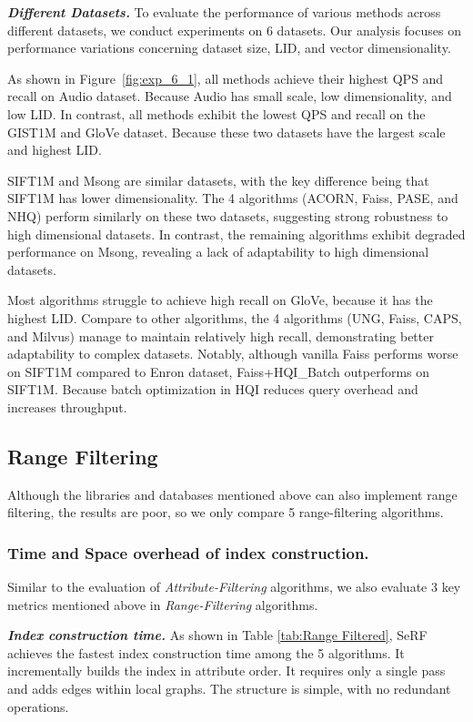 \documentclass[sigconf, nonacm]{acmart}
\begin{document}
\textit{\textbf{Different Datasets.}}  
To evaluate the performance of various methods across different datasets, we conduct experiments on 6 datasets. Our analysis focuses on performance variations concerning dataset size, LID, and vector dimensionality.

As shown in Figure~\ref{fig:exp_6_1}, all methods achieve their highest QPS and recall on Audio dataset. Because Audio has small scale, low dimensionality, and low LID. In contrast, all methods exhibit the lowest QPS and recall on the GIST1M and GloVe dataset. Because these two datasets have the largest scale and highest LID.

SIFT1M and Msong are similar datasets, with the key difference being that SIFT1M has lower dimensionality. The 4 algorithms (ACORN, Faiss, PASE, and NHQ) perform similarly on these two datasets, suggesting strong robustness to high dimensional datasets. In contrast, the remaining algorithms exhibit degraded performance on Msong, revealing a lack of adaptability to high dimensional datasets.

Most algorithms struggle to achieve high recall on GloVe, because it has the highest LID. Compare to other algorithms, the 4 algorithms (UNG, Faiss, CAPS, and Milvus) manage to maintain relatively high recall, demonstrating better adaptability to complex datasets. Notably, although vanilla Faiss performs worse on SIFT1M compared to Enron dataset, Faiss+HQI\_Batch outperforms on SIFT1M. Because batch optimization in HQI reduces query overhead and increases throughput.


\subsection{Range Filtering}
Although the libraries and databases mentioned above can also implement range filtering, the results are poor, so we only compare 5 range-filtering algorithms.
\subsubsection{Time and Space overhead of index construction.}


Similar to the evaluation of \textit{Attribute-Filtering} algorithms, we also evaluate 3 key metrics mentioned above in \textit{Range-Filtering} algorithms.

\textit{\textbf{Index construction time.}}
As shown in Table \ref{tab:Range Filtered}, SeRF achieves the fastest index construction time among the 5 algorithms. It incrementally builds the index in attribute order. It requires only a single pass and adds edges within local graphs. The structure is simple, with no redundant operations.
\end{document}
